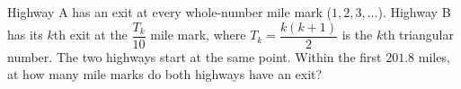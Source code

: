 Highway A has an exit at every whole-number mile mark ($1,2,3,\dots$). Highway B has its $k$th exit at the $\dfrac{T_k}{10}$ mile mark, where $T_k=\dfrac{k(k+1)}{2}$ is the $k$th triangular number. The two highways start at the same point. Within the first $201.8$ miles, at how many mile marks do both highways have an exit?
